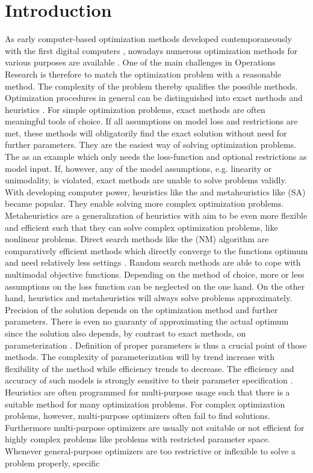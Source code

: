\section{Introduction}
As early computer-based optimization methods developed contemporaneously with the first digital computers \citep{corana_1987}, nowadays numerous optimization methods for various purposes are available \citep{wegener_2005}. One of the main challenges in Operations Research is therefore to match the optimization problem with a reasonable method. The complexity of the problem thereby qualifies the possible methods. Optimization procedures in general can be distinguished into exact methods and heuristics \citep{kirkpatrick_1983}. For simple optimization problems, exact methods are often meaningful tools of choice. If all assumptions on model loss and restrictions are met, these methods will obligatorily find the exact solution without need for further parameters. They are the easiest way of solving optimization problems. The   \citep{dantzig_1959} as an example which only needs the loss-function and optional restrictions as model input. If, however, any of the model assumptions, e.g. linearity or unimodality, is violated, exact methods are unable to solve problems validly. With developing computer power, heuristics like the  \citep{clarke_1964} and metaheuristics like  (SA) \citep{kirkpatrick_1983} became popular. They enable solving more complex optimization problems. Metaheuristics are a generalization of heuristics with aim to be even more flexible and efficient \citep{blum_2003} such that they can solve complex optimization problems, like nonlinear problems. Direct search methods like the  (NM) algorithm are comparatively efficient methods which directly converge to the functions optimum and need relatively less settings \citep{geiger_1999}. Random search methods are able to cope with multimodal objective functions. Depending on the method of choice, more or less assumptions on the loss function can be neglected on the one hand. On the other hand, heuristics and metaheuristics will always solve problems approximately. Precision of the solution depends on the optimization method and further parameters. There is even no guaranty of approximating the actual optimum since the solution also depends, by contrast to exact methods, on parameterization \citep{blum_2003}. Definition of proper parameters is thus a crucial point of those methods. The complexity of parameterization will by trend increase with flexibility of the method while efficiency trends to decrease. The efficiency and accuracy of such models is strongly sensitive to their parameter specification \citep{corana_1987}. Heuristics are often programmed for multi-purpose usage such that there is a suitable method for many optimization problems. For complex optimization problems, however, multi-purpose optimizers often fail to find solutions. Furthermore multi-purpose optimizers are usually not suitable or not efficient for highly complex problems like problems with restricted parameter space. Whenever general-purpose optimizers are too restrictive or inflexible to solve a problem properly, specific 